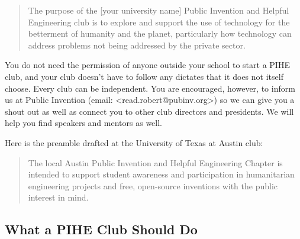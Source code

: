 \documentclass[
	fontsize=10pt, %
	twoside=false, %
	secnumdepth=1, %
]{kaobook}
\begin{document}
\blockquote{
The purpose of the [your university name] Public Invention and Helpful Engineering club is to explore and support the use of technology for the betterment of humanity and the planet, particularly how technology can address problems not being addressed by the private sector.
}

You do not need the permission of anyone outside your school to start a PIHE club, and your club doesn’t have to follow any dictates that it does not itself choose. Every club can be independent. You are encouraged, however, to inform us at Public Invention (email: <read.robert@pubinv.org>)  so we can give you a shout out as well as connect you to other club directors and presidents. We will help you find speakers and mentors as well.

Here is the preamble drafted at the University of Texas at Austin club:
\blockquote{
The local Austin Public Invention and Helpful Engineering Chapter is intended to support student awareness and participation in humanitarian engineering projects and free, open-source inventions with the public interest in mind.
}

\subsection{What a PIHE Club Should Do}
\end{document}
